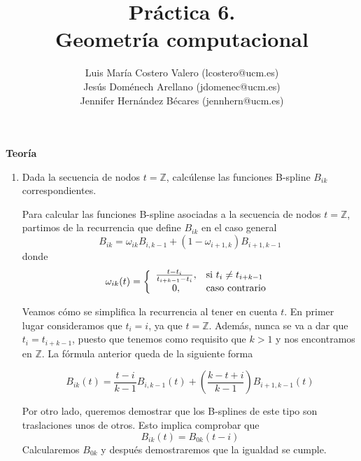 \documentclass[12pt,a4paper]{article}
\title{Práctica 6. \\ Geometría computacional}
\author{Luis María Costero Valero (lcostero@ucm.es)\\
  Jesús Doménech Arellano (jdomenec@ucm.es)\\ 
  Jennifer Hernández Bécares (jennhern@ucm.es)}
\date{}
\begin{document}
\maketitle
\onehalfspace

\begin{center}
  {\textbf{Teoría}}
\end{center}

\begin{enumerate}



\item Dada la secuencia de nodos $t=\mathbb{Z}$, calcúlense las
  funciones B-spline $B_{ik}$ correspondientes.
  
  Para calcular las funciones B-spline asociadas a la secuencia de
  nodos $t=\mathbb{Z}$, partimos de la recurrencia que define $B_{ik}$
  en el caso general
  \begin{equation}
    B_{ik}=\omega_{ik}B_{i,k-1}+(1-\omega_{i+1,k})B_{i+1,k-1}
  \end{equation}
  donde
  \begin{equation}
    \omega_{ik}(t)=
    \left\lbrace
      \begin{array}{c l}
        \frac{t-t_i}{t_{i+k-1}-t_i}, & $si $t_i\neq t_{i+k-1}\\
        0, & $caso contrario $ \\
      \end{array}
    \right.
  \end{equation}

  Veamos cómo se simplifica la recurrencia al tener en cuenta $t$. En primer lugar
  consideramos que $t_i=i$, ya que $t=\mathbb{Z}$. Además, nunca se va
  a dar que $t_{i}=t_{i+k-1}$, puesto que tenemos como requisito que
  $k>1$ y nos encontramos en $\mathbb{Z}$. La fórmula anterior queda
  de la siguiente forma

  \begin{equation}
    B_{ik}(t)=\frac{t-i}{k-1}B_{i,k-1}(t)+(\frac{k-t+i}{k-1})B_{i+1,k-1}(t)
  \end{equation}

  Por otro lado, queremos demostrar que los B-splines de este tipo son
  traslaciones unos de otros. Esto implica comprobar que
  \begin{equation}
    \label{eq:1}
    B_{ik}(t)=B_{0k}(t-i)
  \end{equation}
  Calcularemos $B_{0k}$ y después
  demostraremos que la igualdad se cumple. \\


\end{enumerate}
\end{document}
